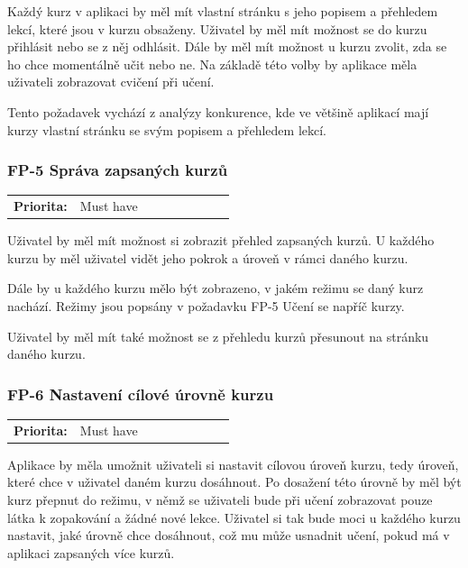 Každý kurz v aplikaci by měl mít vlastní stránku s jeho popisem a přehledem lekcí, které jsou v kurzu obsaženy. Uživatel by měl mít možnost se do kurzu přihlásit nebo se z něj odhlásit. Dále by měl mít možnost u kurzu zvolit, zda se ho chce momentálně učit nebo ne. Na základě této volby by aplikace měla uživateli zobrazovat cvičení při učení.

Tento požadavek vychází z analýzy konkurence, kde ve většině aplikací mají kurzy vlastní stránku se svým popisem a přehledem lekcí.

\subsubsection{FP-5 Správa zapsaných kurzů}

\begin{tabular}{lp{0.7\linewidth}}
    \textbf{Priorita:} & Must have \\
\end{tabular}

Uživatel by měl mít možnost si zobrazit přehled zapsaných kurzů. U každého kurzu by měl uživatel vidět jeho pokrok a úroveň v rámci daného kurzu. 

Dále by u každého kurzu mělo být zobrazeno, v jakém režimu se daný kurz nachází. Režimy jsou popsány v požadavku FP-5 Učení se napříč kurzy. %

Uživatel by měl mít také možnost se z přehledu kurzů přesunout na stránku daného kurzu.

\subsubsection{FP-6 Nastavení cílové úrovně kurzu}

\begin{tabular}{lp{0.7\linewidth}}
    \textbf{Priorita:} & Must have \\
\end{tabular}

Aplikace by měla umožnit uživateli si nastavit cílovou úroveň kurzu, tedy úroveň, které chce v uživatel daném kurzu dosáhnout. Po dosažení této úrovně by měl být kurz přepnut do režimu, v němž se uživateli bude při učení zobrazovat pouze látka k zopakování a žádné nové lekce. Uživatel si tak bude moci u každého kurzu nastavit, jaké úrovně chce dosáhnout, což mu může usnadnit učení, pokud má v aplikaci zapsaných více kurzů.

